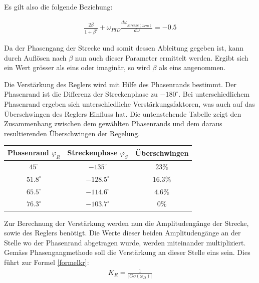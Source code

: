 Es gilt also die folgende Beziehung:\newline

\begin{align}
\frac{2\beta}{1+\beta^2} + \omega_{PID}\frac{d\varphi_{Strecke(\omega_{PID})}}{d\omega} = -0.5
\end{align}\newline

Da der Phasengang der Strecke und somit dessen Ableitung gegeben ist, kann durch Auflösen nach $\beta$ nun auch dieser Parameter ermittelt werden. Ergibt sich ein Wert grösser als eins oder imaginär, so wird $\beta$ als eins angenommen.

Die Verstärkung des Reglers wird mit Hilfe des Phasenrands bestimmt. Der Phasenrand ist die Differenz der Streckenphase zu $-180^\circ$. Bei unterschiedlichem Phasenrand ergeben sich unterschiedliche Verstärkungsfaktoren, was auch auf das Überschwingen des Reglers Einfluss hat. Die untenstehende Tabelle zeigt den Zusammenhang zwischen dem gewählten Phasenrands und dem daraus resultierenden Überschwingen der Regelung.\newline


\begin{table}[h]
\centering
\renewcommand*{\arraystretch}{1.2}
\begin{tabular}{|c|c|c|}
\hline 
\textbf{Phasenrand $\varphi_R$} & \textbf{Streckenphase $\varphi_S$} & \textbf{Überschwingen} \\ 
\hline 
$45^\circ$ & $-135^\circ$ & $23\%$ \\ 
\hline 
$51.8^\circ$ & $-128.5^\circ$ & $16.3\%$ \\ 
\hline 
 $65.5^\circ$& $-114.6^\circ$ & $4.6\%$ \\ 
\hline 
$76.3^\circ$ & $-103.7^\circ$ & $0\%$ \\ 
\hline
\end{tabular} 
\renewcommand*{\arraystretch}{1}
\end{table}

\newpage
Zur Berechnung der Verstärkung werden nun die Amplitudengänge der Strecke, sowie des Reglers benötigt. Die Werte dieser beiden Amplitudengänge an der Stelle wo der Phasenrand abgetragen wurde, werden miteinander multipliziert. Gemäss Phasengangmethode soll die Verstärkung an dieser Stelle eins sein. Dies führt zur Formel \ref{formelkr}:\newline
\begin{align}
K_R=\frac{1}{\vert{Go(\omega_D)}\vert{}}
\label{formelkr}
\end{align}


